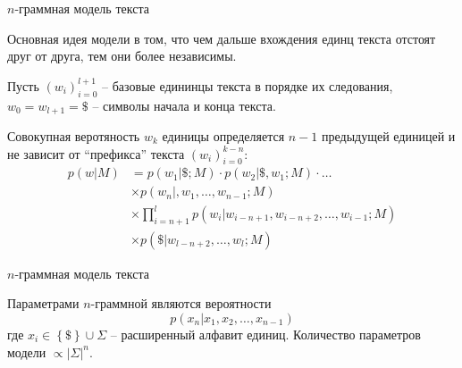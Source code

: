 \documentclass{beamer}
\newcommand{\obj}[1]{\left\{ #1 \right \}}
\newcommand{\brac}[1]{\left ( #1 \right )}
\newcommand{\induc}[1]{\left . #1 \right \vert}
\newcommand{\abs}[1]{\left | #1 \right |}
\begin{document}
\begin{frame}{$n$-граммная модель текста}
  \begin{block}

    Основная идея модели в том, что чем дальше вхождения единц текста отстоят друг от друга, тем они более независимы. 
  \end{block}

  \begin{block}

    Пусть $\brac{w_i}_{i=0}^{l+1}$ -- базовые едининцы текста в порядке их следования, $w_0=w_{l+1}=\$$ -- символы начала и конца текста.

    Совокупная веротяность $w_k$ единицы определяется $n-1$ предыдущей единицей и не зависит от ``префикса'' текста $\brac{w_i}_{i=0}^{k-n}$:
    \begin{align*}
      p\brac{\induc{w}M} &= p\brac{\induc{w_1}\$;M} \cdot p\brac{\induc{w_2}\$,w_1;M} \cdot \ldots \\
        &\times p\brac{\induc{w_n},w_1,\ldots,w_{n-1};M} \\
        &\times \prod_{i=n+1}^l p\brac{\induc{w_i}w_{i-n+1}, w_{i-n+2}, \ldots, w_{i-1};M} \\ 
        &\times p\brac{\induc{\$}w_{l-n+2}, \ldots, w_l;M}
    \end{align*}
  \end{block}
\end{frame}

\begin{frame}{$n$-граммная модель текста}
  \begin{block}

    Параметрами $n$-граммной являются вероятности
    \[p\brac{\induc{x_n}x_1, x_2, \ldots, x_{n-1}}\] 
    где $x_i\in \obj{\$}\cup \Sigma$ -- расширенный алфавит единиц.
    Количество параметров модели $\propto \abs{\Sigma}^n$. 
  \end{block}
\end{frame}
\end{document}
